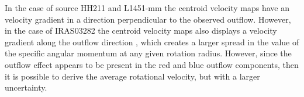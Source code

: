 In the case of source HH211 and L1451-mm the centroid velocity maps have an velocity gradient 
in a direction perpendicular to the observed outflow. 
However, in the case of IRAS03282 the centroid velocity maps also displays a velocity gradient 
along the outflow direction \citep{Tobin_2011}, which creates a larger spread in the value of the 
specific angular momentum at any given rotation radius.
However, since the outflow effect appears to be present in the red and blue outflow components, then 
it is possible to derive the average rotational velocity, but with a larger uncertainty.
